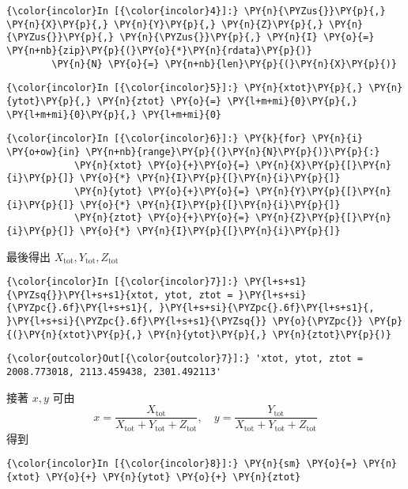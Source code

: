 \documentclass[12pt, a4paper]{article}
\begin{document}
\begin{enumerate}[label={\bf (\alph*)}, leftmargin=0pt]
    \begin{Verbatim}[commandchars=\\\{\}]
{\color{incolor}In [{\color{incolor}4}]:} \PY{n}{\PYZus{}}\PY{p}{,} \PY{n}{X}\PY{p}{,} \PY{n}{Y}\PY{p}{,} \PY{n}{Z}\PY{p}{,} \PY{n}{\PYZus{}}\PY{p}{,} \PY{n}{\PYZus{}}\PY{p}{,} \PY{n}{I} \PY{o}{=} \PY{n+nb}{zip}\PY{p}{(}\PY{o}{*}\PY{n}{rdata}\PY{p}{)}
        \PY{n}{N} \PY{o}{=} \PY{n+nb}{len}\PY{p}{(}\PY{n}{X}\PY{p}{)}
\end{Verbatim}

    \begin{Verbatim}[commandchars=\\\{\}]
{\color{incolor}In [{\color{incolor}5}]:} \PY{n}{xtot}\PY{p}{,} \PY{n}{ytot}\PY{p}{,} \PY{n}{ztot} \PY{o}{=} \PY{l+m+mi}{0}\PY{p}{,} \PY{l+m+mi}{0}\PY{p}{,} \PY{l+m+mi}{0}
\end{Verbatim}

    \begin{Verbatim}[commandchars=\\\{\}]
{\color{incolor}In [{\color{incolor}6}]:} \PY{k}{for} \PY{n}{i} \PY{o+ow}{in} \PY{n+nb}{range}\PY{p}{(}\PY{n}{N}\PY{p}{)}\PY{p}{:}
            \PY{n}{xtot} \PY{o}{+}\PY{o}{=} \PY{n}{X}\PY{p}{[}\PY{n}{i}\PY{p}{]} \PY{o}{*} \PY{n}{I}\PY{p}{[}\PY{n}{i}\PY{p}{]}
            \PY{n}{ytot} \PY{o}{+}\PY{o}{=} \PY{n}{Y}\PY{p}{[}\PY{n}{i}\PY{p}{]} \PY{o}{*} \PY{n}{I}\PY{p}{[}\PY{n}{i}\PY{p}{]}
            \PY{n}{ztot} \PY{o}{+}\PY{o}{=} \PY{n}{Z}\PY{p}{[}\PY{n}{i}\PY{p}{]} \PY{o}{*} \PY{n}{I}\PY{p}{[}\PY{n}{i}\PY{p}{]}
\end{Verbatim}

\clearpage
    最後得出 $X_\text{tot}, Y_\text{tot}, Z_\text{tot}$
    \begin{Verbatim}[commandchars=\\\{\}]
{\color{incolor}In [{\color{incolor}7}]:} \PY{l+s+s1}{\PYZsq{}}\PY{l+s+s1}{xtot, ytot, ztot = }\PY{l+s+si}{\PYZpc{}.6f}\PY{l+s+s1}{, }\PY{l+s+si}{\PYZpc{}.6f}\PY{l+s+s1}{, }\PY{l+s+si}{\PYZpc{}.6f}\PY{l+s+s1}{\PYZsq{}} \PY{o}{\PYZpc{}} \PY{p}{(}\PY{n}{xtot}\PY{p}{,} \PY{n}{ytot}\PY{p}{,} \PY{n}{ztot}\PY{p}{)}
\end{Verbatim}

            \begin{Verbatim}[commandchars=\\\{\}]
{\color{outcolor}Out[{\color{outcolor}7}]:} 'xtot, ytot, ztot = 2008.773018, 2113.459438, 2301.492113'
\end{Verbatim}


    接著 $x, y$ 可由 
    \[ x = \frac{X_\text{tot}}{X_\text{tot} + Y_\text{tot} + Z_\text{tot}}, \quad
       y = \frac{Y_\text{tot}}{X_\text{tot} + Y_\text{tot} + Z_\text{tot}} \]
     得到
    \begin{Verbatim}[commandchars=\\\{\}]
{\color{incolor}In [{\color{incolor}8}]:} \PY{n}{sm} \PY{o}{=} \PY{n}{xtot} \PY{o}{+} \PY{n}{ytot} \PY{o}{+} \PY{n}{ztot}
\end{Verbatim}


\end{enumerate}
\end{document}
